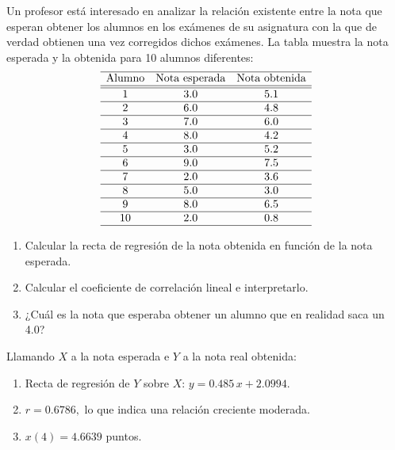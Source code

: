{Un profesor está interesado en analizar la relación existente entre la nota que esperan obtener los alumnos en los exámenes de su
asignatura con la que de verdad obtienen una vez corregidos dichos exámenes. La tabla muestra la nota esperada y la obtenida para 10 alumnos
diferentes: 
\[
\begin{array}{ccc}
\hline
\text{Alumno} & \text{Nota esperada} & \text{Nota obtenida} \\
\hline \hline
   1    &      3.0      &      5.1      \\
\hline
   2    &      6.0      &      4.8      \\
\hline
   3    &      7.0      &      6.0      \\
\hline
   4    &      8.0      &      4.2      \\
\hline
   5    &      3.0      &      5.2      \\
\hline
   6    &      9.0      &      7.5      \\
\hline
   7    &      2.0      &      3.6      \\
\hline
   8    &      5.0      &      3.0      \\
\hline
   9    &      8.0      &      6.5      \\
\hline
   10   &      2.0      &      0.8      \\
\hline
\end{array}
\]

\begin{enumerate}
\item Calcular la recta de regresión de la nota obtenida en función de la nota esperada.
\item Calcular el coeficiente de correlación lineal e interpretarlo.
\item ¿Cuál es la nota que esperaba obtener un alumno que en realidad saca un 4.0?
\end{enumerate}
}
{Llamando $X$ a la nota esperada e $Y$ a la nota real obtenida:
\begin{enumerate}
\item Recta de regresión de $Y$ sobre $X$: $y=0.485\,x+2.0994$.
\item $r=0.6786,$ lo que indica una relación creciente moderada.
\item $x(4)=4.6639$ puntos.
\end{enumerate}
}
